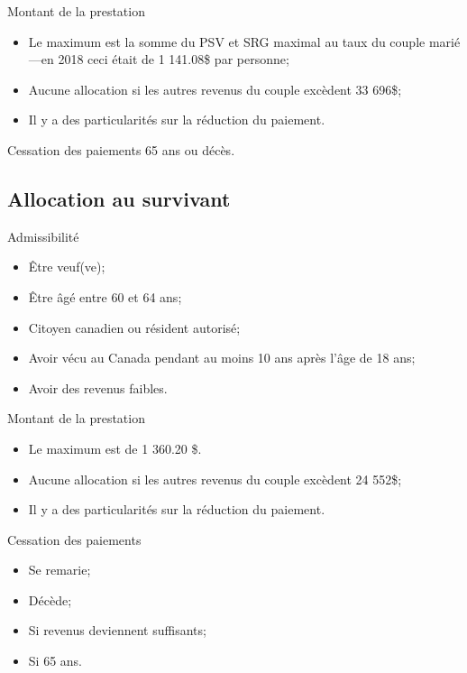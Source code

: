 \documentclass[10pt, french]{article}
\begin{document}
\begin{multicols*}{3}
\begin{conceptgen}{Montant de la prestation}

\begin{itemize}[leftmargin = *]
	\item	Le maximum est la somme du PSV et SRG maximal au taux du couple marié---en 2018 ceci était de 1 141.08\$ par personne;
	\item	Aucune allocation si les autres revenus du couple excèdent 33 696\$;
	\item	Il y a des particularités sur la réduction du paiement.
\end{itemize}
\end{conceptgen}

\begin{conceptgen}{Cessation des paiements}
65 ans ou décès.
\end{conceptgen}

\subsection{Allocation au survivant}
\begin{conceptgen}{Admissibilité}

\begin{itemize}[leftmargin = *]
	\item	Être veuf(ve);
	\item	Être âgé entre 60 et 64 ans;
	\item	Citoyen canadien ou résident autorisé;
	\item	Avoir vécu au Canada pendant au moins 10 ans après l'âge de 18 ans;
	\item	Avoir des revenus faibles.
\end{itemize}
\end{conceptgen}

\begin{conceptgen}{Montant de la prestation}
\begin{itemize}[leftmargin = *]
	\item	Le maximum est de 1 360.20 \$.
	\item	Aucune allocation si les autres revenus du couple excèdent 24 552\$;
	\item	Il y a des particularités sur la réduction du paiement.
\end{itemize}
\end{conceptgen}

\begin{conceptgen}{Cessation des paiements}
\begin{itemize}[leftmargin = *]
	\item	Se remarie;
	\item	Décède;
	\item	Si revenus deviennent suffisants;
	\item	Si 65 ans.
\end{itemize}
\end{conceptgen}



\end{multicols*}
\end{document}
